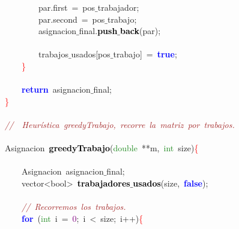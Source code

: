 \mbox{}\ \ \ \ \ \ \ \ par\textcolor{BrickRed}{.}first\ \textcolor{BrickRed}{=}\ pos$\_$trabajador\textcolor{BrickRed}{;}\ \  \\
\mbox{}\ \ \ \ \ \ \ \ par\textcolor{BrickRed}{.}second\ \textcolor{BrickRed}{=}\ pos$\_$trabajo\textcolor{BrickRed}{;}\  \\
\mbox{}\ \ \ \ \ \ \ \ asignacion$\_$final\textcolor{BrickRed}{.}\textbf{\textcolor{Black}{push$\_$back}}\textcolor{BrickRed}{(}par\textcolor{BrickRed}{);}\  \\
\mbox{} \\
\mbox{}\ \ \ \ \ \ \ \ trabajos$\_$usados\textcolor{BrickRed}{[}pos$\_$trabajo\textcolor{BrickRed}{]}\ \textcolor{BrickRed}{=}\ \textbf{\textcolor{Blue}{true}}\textcolor{BrickRed}{;}\  \\
\mbox{}\ \ \ \ \textcolor{Red}{\}} \\
\mbox{} \\
\mbox{}\ \ \ \ \textbf{\textcolor{Blue}{return}}\ asignacion$\_$final\textcolor{BrickRed}{;}\  \\
\mbox{}\textcolor{Red}{\}} \\
\mbox{} \\
\mbox{}\textit{\textcolor{Brown}{//\ \ Heurística\ greedyTrabajo,\ recorre\ la\ matriz\ por\ trabajos.\ }} \\
\mbox{} \\
\mbox{}\textcolor{TealBlue}{Asignacion}\ \textbf{\textcolor{Black}{greedyTrabajo}}\textcolor{BrickRed}{(}\textcolor{ForestGreen}{double}\ \textcolor{BrickRed}{**}m\textcolor{BrickRed}{,}\ \textcolor{ForestGreen}{int}\ size\textcolor{BrickRed}{)}\textcolor{Red}{\{} \\
\mbox{}\ \ \ \  \\
\mbox{}\ \ \ \ \textcolor{TealBlue}{Asignacion}\ asignacion$\_$final\textcolor{BrickRed}{;}\  \\
\mbox{}\ \ \ \ \textcolor{TealBlue}{vector\textless{}bool\textgreater{}}\ \textbf{\textcolor{Black}{trabajadores$\_$usados}}\textcolor{BrickRed}{(}size\textcolor{BrickRed}{,}\ \textbf{\textcolor{Blue}{false}}\textcolor{BrickRed}{);}\  \\
\mbox{}\ \ \ \  \\
\mbox{}\ \ \ \ \textit{\textcolor{Brown}{//\ Recorremos\ los\ trabajos.\ }} \\
\mbox{}\ \ \ \ \textbf{\textcolor{Blue}{for}}\ \textcolor{BrickRed}{(}\textcolor{ForestGreen}{int}\ i\ \textcolor{BrickRed}{=}\ \textcolor{Purple}{0}\textcolor{BrickRed}{;}\ i\ \textcolor{BrickRed}{\textless{}}\ size\textcolor{BrickRed}{;}\ i\textcolor{BrickRed}{++)}\textcolor{Red}{\{} \\
